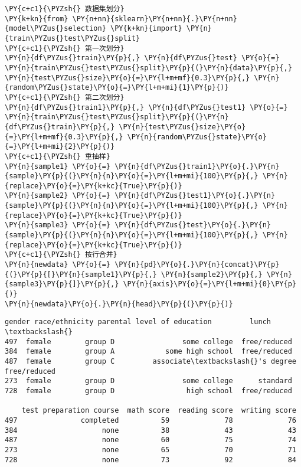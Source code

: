     \begin{tcolorbox}[breakable, size=fbox, boxrule=1pt, pad at break*=1mm,colback=cellbackground, colframe=cellborder]
\begin{Verbatim}[commandchars=\\\{\}]
\PY{c+c1}{\PYZsh{} 数据集划分}
\PY{k+kn}{from} \PY{n+nn}{sklearn}\PY{n+nn}{.}\PY{n+nn}{model\PYZus{}selection} \PY{k+kn}{import} \PY{n}{train\PYZus{}test\PYZus{}split}
\PY{c+c1}{\PYZsh{} 第一次划分}
\PY{n}{df\PYZus{}train}\PY{p}{,} \PY{n}{df\PYZus{}test} \PY{o}{=} \PY{n}{train\PYZus{}test\PYZus{}split}\PY{p}{(}\PY{n}{data}\PY{p}{,} \PY{n}{test\PYZus{}size}\PY{o}{=}\PY{l+m+mf}{0.3}\PY{p}{,} \PY{n}{random\PYZus{}state}\PY{o}{=}\PY{l+m+mi}{1}\PY{p}{)}
\PY{c+c1}{\PYZsh{} 第二次划分}
\PY{n}{df\PYZus{}train1}\PY{p}{,} \PY{n}{df\PYZus{}test1} \PY{o}{=} \PY{n}{train\PYZus{}test\PYZus{}split}\PY{p}{(}\PY{n}{df\PYZus{}train}\PY{p}{,} \PY{n}{test\PYZus{}size}\PY{o}{=}\PY{l+m+mf}{0.3}\PY{p}{,} \PY{n}{random\PYZus{}state}\PY{o}{=}\PY{l+m+mi}{2}\PY{p}{)}
\PY{c+c1}{\PYZsh{} 重抽样}
\PY{n}{sample1} \PY{o}{=} \PY{n}{df\PYZus{}train1}\PY{o}{.}\PY{n}{sample}\PY{p}{(}\PY{n}{n}\PY{o}{=}\PY{l+m+mi}{100}\PY{p}{,} \PY{n}{replace}\PY{o}{=}\PY{k+kc}{True}\PY{p}{)}
\PY{n}{sample2} \PY{o}{=} \PY{n}{df\PYZus{}test1}\PY{o}{.}\PY{n}{sample}\PY{p}{(}\PY{n}{n}\PY{o}{=}\PY{l+m+mi}{100}\PY{p}{,} \PY{n}{replace}\PY{o}{=}\PY{k+kc}{True}\PY{p}{)}
\PY{n}{sample3} \PY{o}{=} \PY{n}{df\PYZus{}test}\PY{o}{.}\PY{n}{sample}\PY{p}{(}\PY{n}{n}\PY{o}{=}\PY{l+m+mi}{100}\PY{p}{,} \PY{n}{replace}\PY{o}{=}\PY{k+kc}{True}\PY{p}{)}
\PY{c+c1}{\PYZsh{} 按行合并}
\PY{n}{newdata} \PY{o}{=} \PY{n}{pd}\PY{o}{.}\PY{n}{concat}\PY{p}{(}\PY{p}{[}\PY{n}{sample1}\PY{p}{,} \PY{n}{sample2}\PY{p}{,} \PY{n}{sample3}\PY{p}{]}\PY{p}{,} \PY{n}{axis}\PY{o}{=}\PY{l+m+mi}{0}\PY{p}{)}
\PY{n}{newdata}\PY{o}{.}\PY{n}{head}\PY{p}{(}\PY{p}{)}
\end{Verbatim}
\end{tcolorbox}

            \begin{tcolorbox}[breakable, size=fbox, boxrule=.5pt, pad at break*=1mm, opacityfill=0]
\begin{Verbatim}[commandchars=\\\{\}]
     gender race/ethnicity parental level of education         lunch  \textbackslash{}
497  female        group D                some college  free/reduced
384  female        group A            some high school  free/reduced
487  female        group C         associate\textbackslash{}'s degree  free/reduced
273  female        group D                some college      standard
728  female        group D                 high school  free/reduced

    test preparation course  math score  reading score  writing score
497               completed          59             78             76
384                    none          38             43             43
487                    none          60             75             74
273                    none          65             70             71
728                    none          73             92             84
\end{Verbatim}
\end{tcolorbox}
